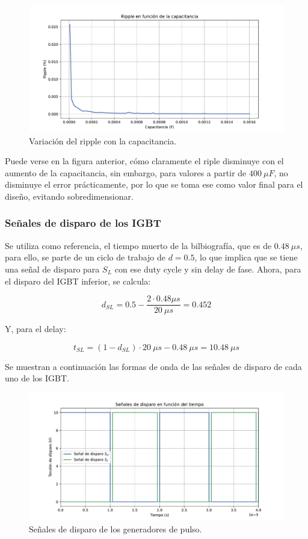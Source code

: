 \begin{figure}
	\centering
	\includegraphics[width=1\linewidth]{../ripple}
	\caption{Variación del ripple con la capacitancia.}
	\label{fig:ripple}
\end{figure}

Puede verse en la figura anterior, cómo claramente el riple disminuye con el aumento de la capacitancia, sin embargo, para valores a partir de $400 \ \mu F$, no disminuye el error prácticamente, por lo que se toma ese como valor final para el diseño, evitando sobredimensionar.

\subsubsection{Señales de disparo de los IGBT}

Se utiliza como referencia, el tiempo muerto de la bilbiografía, que es de $0.48 \ \mu s$, para ello, se parte de un ciclo de trabajo de $d=0.5$, lo que implica que se tiene una señal de disparo para $S_L$ con ese duty cycle y sin delay de fase. Ahora, para el disparo del IGBT inferior, se calcula:

$$d_{SL} = 0.5 - \frac{2\cdot 0.48 \mu s}{20 \ \mu s}=0.452$$

Y, para el delay:

$$t_{SL}=(1-d_{SL})\cdot 20 \ \mu s - 0.48 \ \mu s= 10.48 \ \mu s$$

Se muestran a continuación las formas de onda de las señales de disparo de cada uno de los IGBT. 

\begin{figure}
	\centering
	\includegraphics[width=1\linewidth]{../disparo}
	\caption{Señales de disparo de los generadores de pulso.}
	\label{fig:disparo}
\end{figure}

